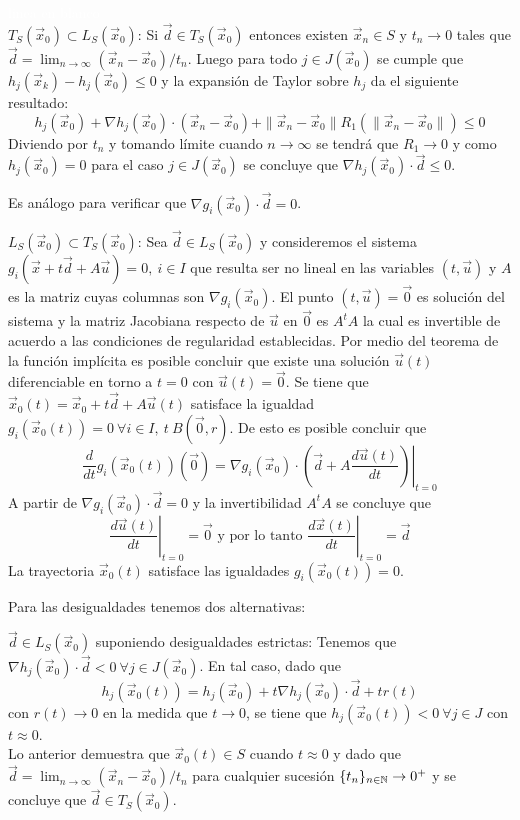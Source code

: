 \begin{demostracion}\textcolor{white}{linea en blanco}
\\$T_S(\vec{x}_0)\subset L_S(\vec{x}_0)$: Si $\vec{d}\in T_S(\vec{x}_0)$ entonces existen $\vec{x}_n \in S$ y $t_n \to 0$ tales que $\vec{d} = \lim_{n\to \infty} (\vec{x}_n-\vec{x}_0)/t_n$. Luego para todo $j\in J(\vec{x}_0)$ se cumple que $h_j(\vec{x}_k)-h_j(\vec{x}_0) \leq 0$ y la expansi\'on de Taylor sobre $h_j$ da el siguiente resultado:
$$h_j(\vec{x}_0) + \nabla h_j(\vec{x}_0)\cdot (\vec{x}_n-\vec{x}_0) + \|\vec{x}_n - \vec{x}_0\| R_1(\|\vec{x}_n - \vec{x}_0\|) \leq 0$$
Diviendo por $t_n$ y tomando l\'imite cuando $n\to \infty$ se tendr\'a que $R_1 \to 0$ y como $h_j(\vec{x}_0)=0$ para el caso $j\in J(\vec{x}_0)$ se concluye que $\nabla h_j(\vec{x}_0)\cdot \vec{d} \leq 0$.

Es an\'alogo para verificar que $\nabla g_i(\vec{x}_0)\cdot \vec{d} = 0$.

\medskip

$L_S(\vec{x}_0)\subset T_S(\vec{x}_0)$: Sea $\vec{d}\in L_S(\vec{x}_0)$ y consideremos el sistema $g_i(\vec{x}+t\vec{d}+A\vec{u})=0, \:i\in I$ que resulta ser no lineal en las variables $(t,\vec{u})$ y $A$ es la matriz cuyas columnas son $\nabla g_i(\vec{x}_0)$. El punto $(t,\vec{u})=\vec{0}$ es soluci\'on del sistema y la matriz Jacobiana respecto de $\vec{u}$ en $\vec{0}$ es $A^t A$ la cual es invertible de acuerdo a las condiciones de regularidad establecidas. Por medio del teorema de la funci\'on impl\'icita es posible concluir que existe una soluci\'on $\vec{u}(t)$ diferenciable en torno a $t=0$ con $\vec{u}(t)=\vec{0}$. Se tiene que
$\vec{x}_0(t)=\vec{x}_0+t\vec{d}+A\vec{u}(t)$ satisface la igualdad $g_i(\vec{x}_0(t))=0 \:\forall i \in I,\:t \:B(\vec{0},r)$. De esto es posible concluir que
$$\frac{d}{dt}g_i(\vec{x}_0(t))(\vec{0})=\nabla g_i(\vec{x}_0)\cdot \left.\left(\vec{d}+A\frac{d\vec{u}(t)}{dt}\right)\right|_{t=0}$$ 
A partir de $\nabla g_i(\vec{x}_0)\cdot \vec{d} = 0$ y la invertibilidad $A^t A$ se concluye que 
$$\left.\frac{d\vec{u}(t)}{dt}\right|_{t=0} = \vec{0} \text{ y por lo tanto } \left.\frac{d\vec{x}(t)}{dt}\right|_{t=0} = \vec{d}$$
La trayectoria $\vec{x}_0(t)$ satisface las igualdades $g_i(\vec{x}_0(t))=0$. 

Para las desigualdades tenemos dos alternativas:

$\vec{d}\in L_S(\vec{x}_0)$ suponiendo desigualdades estrictas: Tenemos que $\nabla h_j(\vec{x}_0) \cdot \vec{d} < 0 \:\forall j\in J(\vec{x}_0)$. En tal caso, dado que 
$$h_j (\vec{x}_0(t))=h_j(\vec{x}_0)+t\nabla h_j(\vec{x}_0)\cdot \vec{d} + tr(t)$$
con $r(t)\to 0$ en la medida que $t\to 0$, se tiene que $h_j(\vec{x}_0(t))<0 \:\forall j\in J$ con $t\approx 0$.
\\Lo anterior demuestra que $\vec{x}_0(t)\in S$ cuando $t\approx 0$ y dado que $\vec{d} = \lim_{n\to \infty} (\vec{x}_n-\vec{x}_0)/t_n$ para cualquier sucesi\'on $\{t_n\}_{n\in \mathbb{N}} \to 0^+$  y se concluye que $\vec{d}\in T_S(\vec{x}_0)$.  


\end{demostracion}
